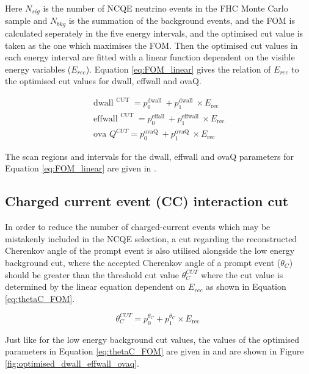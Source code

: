 Here $N_{sig}$ is the number of NCQE neutrino events in the FHC Monte Carlo sample and $N_{bkg}$ is the summation of the background events, and the FOM is calculated seperately in the five energy intervals, and the optimised cut value is taken as the one which maximises the FOM. Then the optimised cut values in each energy interval are fitted with a linear function dependent on the visible energy variables ($E_{rec}$). Equation \ref{eq:FOM_linear} gives the relation of $E_{rec}$ to the optimised cut values for dwall, effwall and ovaQ.

\begin{align}
    \text { dwall }^{\text {CUT }} =p_{0}^{\text {dwall }}+p_{1}^{\text {dwall }} \times E_{\text {rec }} \\
    \text { effwall }^{\text {CUT }}=p_{0}^{\text {effall }}+p_{1}^{\text {effwall }} \times E_{\text {rec }} \\
    \text { ova } Q^{C U T}=p_{0}^{\text {ovaQ }}+p_{1}^{\text {ovaQ }} \times E_{\text {rec }}
\label{eq:FOM_linear}
\end{align}


The scan regions and intervals for the dwall, effwall and ovaQ parameters for Equation \ref{eq:FOM_linear} are given in \cite{Abe_2019}. 

\subsection{Charged current event (CC) interaction cut}

In order to reduce the number of charged-current events which may be mistakenly included in the NCQE selection, a cut regarding the reconstructed Cherenkov angle of the prompt event  is also utilised alongside the low energy background cut, where the accepted Cherenkov angle of a prompt event ($\theta_{C}$) should be greater than the threshold cut value $\theta_{C}^{CUT}$ where the cut value is determined by the linear equation dependent on $E_{rec}$ as shown in Equation \ref{eq:thetaC_FOM}.

\begin{equation}
    \theta_{C}^{C U T}=p_{0}^{\theta_{C}}+p_{1}^{\theta_{C}} \times E_{\text {rec }}
    \label{eq:thetaC_FOM} 
\end{equation}

Just like for the low energy background cut values, the values of the optimised parameters in Equation \ref{eq:thetaC_FOM} are given in \cite{Abe_2019} and are shown in Figure \ref{fig:optimised_dwall_effwall_ovaq}.


